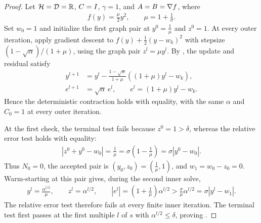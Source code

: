 \documentclass[11pt]{article}
\begin{document}
\begin{proof}
    Let $\mathcal{H}=\mathcal{D}=\mathbb{R}$, ${C}=I$, $\gamma=1$, and ${A}={B}=\nabla f$, where
    \begin{align}
        f(y)=\frac{\mu}{2}y^2, \qquad \mu=1+\frac{1}{\sigma}.
    \end{align}
    Set $w_0=1$ and initialize the first graph pair at $y^0=\frac{1}{\mu}$ and $z^0=1$.
    At every outer iteration, apply gradient descent to $f(y)+\frac{1}{2}(y-w_k)^2$ with stepsize $(1-\sqrt{\alpha})/(1+\mu)$, using the graph pair $z^l=\mu y^l$.
    By \citet[Theorem 2.1.15]{nesterov2004introductory}, the update and residual satisfy
    \begin{align}
        y^{l+1}&=y^l-\frac{1-\sqrt{\alpha}}{1+\mu}\left((1+\mu)y^l-w_k\right),\\
        e^{l+1}&=\sqrt{\alpha}\,e^l, \qquad e^l=(1+\mu)y^l-w_k.
    \end{align}
    Hence the deterministic contraction holds with equality, with the same $\alpha$ and $C_0=1$ at every outer iteration.

    At the first check, the terminal test fails because $z^0=1>\delta$, whereas the relative error test holds with equality:
    \begin{align}
        |z^0+y^0-w_0|=\frac{1}{\mu}
        =\sigma\left(1-\frac{1}{\mu}\right)=\sigma|y^0-w_0|.
    \end{align}
    Thus $N_0=0$, the accepted pair is $(y_0,z_0)=(\frac{1}{\mu},1)$, and $w_1=w_0-z_0=0$.
    Warm-starting at this pair gives, during the second inner solve,
    \begin{align}
        y^l=\frac{\alpha^{l/2}}{\mu}, \qquad z^l=\alpha^{l/2}, \qquad
        |e^l|=\left(1+\frac{1}{\mu}\right)\alpha^{l/2}
        >\frac{\sigma}{\mu}\alpha^{l/2}=\sigma|y^l-w_1|.
    \end{align}
    The relative error test therefore fails at every finite inner iteration.
    The terminal test first passes at the first multiple $l$ of $s$ with $\alpha^{l/2}\leq\delta$, proving .


\end{proof}
\end{document}
